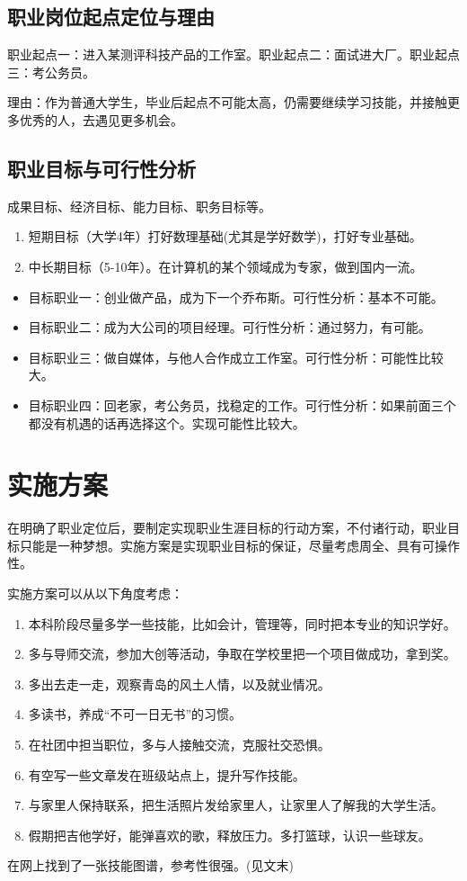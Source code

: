 \documentclass{article}
\begin{document}
\subsection{职业岗位起点定位与理由}
职业起点一：进入某测评科技产品的工作室。职业起点二：面试进大厂。职业起点三：考公务员。\par
理由：作为普通大学生，毕业后起点不可能太高，仍需要继续学习技能，并接触更多优秀的人，去遇见更多机会。
\subsection{职业目标与可行性分析}

成果目标、经济目标、能力目标、职务目标等。
\begin{enumerate}[(1)]
	\item 短期目标（大学4年）打好数理基础(尤其是学好数学)，打好专业基础。
	\item 中长期目标（5-10年）。在计算机的某个领域成为专家，做到国内一流。
\end{enumerate}
\begin{itemize}
    \item 目标职业一：创业做产品，成为下一个乔布斯。可行性分析：基本不可能。
    \item 目标职业二：成为大公司的项目经理。可行性分析：通过努力，有可能。
    \item 目标职业三：做自媒体，与他人合作成立工作室。可行性分析：可能性比较大。
    \item 目标职业四：回老家，考公务员，找稳定的工作。可行性分析：如果前面三个都没有机遇的话再选择这个。实现可能性比较大。
\end{itemize}


\section{实施方案}
在明确了职业定位后，要制定实现职业生涯目标的行动方案，不付诸行动，职业目标只能是一种梦想。实施方案是实现职业目标的保证，尽量考虑周全、具有可操作性。\par
实施方案可以从以下角度考虑：\par
\begin{enumerate}[1、]
	\item 本科阶段尽量多学一些技能，比如会计，管理等，同时把本专业的知识学好。
	\item 多与导师交流，参加大创等活动，争取在学校里把一个项目做成功，拿到奖。
	\item 多出去走一走，观察青岛的风土人情，以及就业情况。
	\item 多读书，养成“不可一日无书”的习惯。
	\item 在社团中担当职位，多与人接触交流，克服社交恐惧。
	\item 有空写一些文章发在班级站点上，提升写作技能。
	\item 与家里人保持联系，把生活照片发给家里人，让家里人了解我的大学生活。
	\item 假期把吉他学好，能弹喜欢的歌，释放压力。多打篮球，认识一些球友。
\end{enumerate}
在网上找到了一张技能图谱，参考性很强。(见文末)
\end{document}
